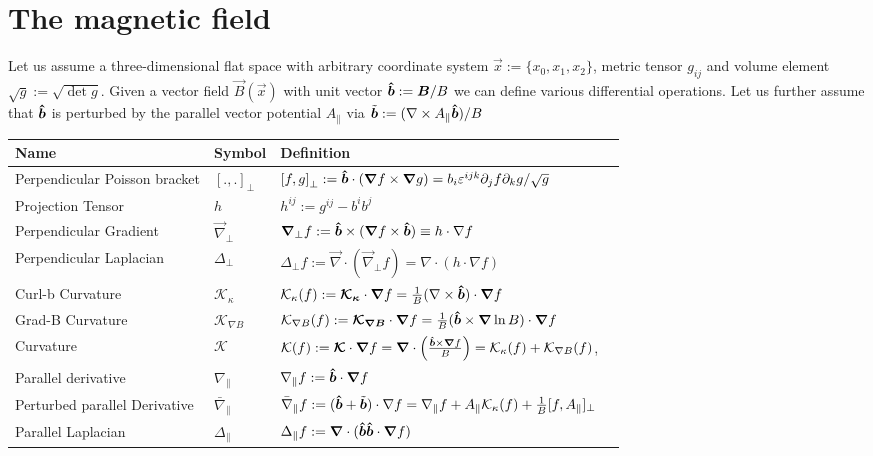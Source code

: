 \section{The magnetic field}\label{sec:magnetic}
Let us assume a three-dimensional flat space with arbitrary coordinate
system $\vec x :=\{x_0, x_1, x_2\}$, metric
tensor $g_{ij}$ and volume element $\sqrt{g} := \sqrt{\det g}$.
Given a vector field $\vec B(\vec x)$ with unit vector $\bm{\hat{b}} := {\boldsymbol{B}}/B$
we can define various differential operations.
Let us further assume that $\bm{\hat{b}}$ is perturbed by the parallel
vector potential $A_\parallel$ via
$\tilde{ {\boldsymbol{b}} } := ({\nabla \times A_\parallel \bm{\hat{b}})}/{B}$
\begin{longtable}{lll>{\RaggedRight}p{7cm}}
\rowcolor{gray!50}\textbf{Name} &  \textbf{Symbol} & \textbf{Definition} \\
\midrule
    Perpendicular Poisson bracket&
    $\left[.,.\right]_\perp$ &
    $\left[f,g\right]_\perp := \bm{\hat{b}} \cdot \left({\boldsymbol{\nabla}} f \times {\boldsymbol{\nabla}} g\right) =
    b_i \varepsilon^{ijk}\partial_j f\partial_k g/\sqrt{g}$  \\
    Projection Tensor&
    $h $ & $h^{ij} := g^{ij} - b^ib^j $\\
    Perpendicular Gradient&
    $\vec \nabla_\perp $&
    $ {\boldsymbol{\nabla}}_\perp f := \bm{\hat{b}}\times({\boldsymbol{\nabla}} f\times \bm{\hat{b}} ) \equiv
    h \cdot \nabla f$ \\
    Perpendicular Laplacian&
    $\Delta_\perp $&
    $ \Delta_\perp f:= \vec \nabla\cdot (\vec \nabla_\perp f)
    = \nabla\cdot( h\cdot\nabla f)$  \\
    Curl-b Curvature &
    $\mathcal K_\kappa$ &
    $\mathcal K_\kappa(f) := {\boldsymbol{ \mathcal K_\kappa }}\cdot {\boldsymbol{\nabla}} f = \frac{1}{B}(\nabla \times \bm{\hat{b}})\cdot {\boldsymbol{\nabla}} f$ \\
    Grad-B Curvature &
    $\mathcal K_{\nabla B} $ &
    $\mathcal K_{\nabla B}(f) := {\boldsymbol{\mathcal K_{\nabla B}}} \cdot {\boldsymbol{\nabla}} f = \frac{1}{B}(\bm{\hat{b}} \times {\boldsymbol{\nabla}} \ln B)\cdot {\boldsymbol{\nabla}} f$ \\
    Curvature &
    $\mathcal K$ &
    $\mathcal{K}(f):={\boldsymbol{\mathcal K}} \cdot {\boldsymbol{\nabla}} f = {\boldsymbol{\nabla}} \cdot \left(\frac{ \bm{\hat{b}} \times {\boldsymbol{\nabla}} f}{B} \right) = \mathcal K_\kappa(f) + \mathcal K_{\nabla B}(f)$,\\
    Parallel derivative&
    $\nabla_\parallel $&
    $ \nabla_\parallel f := \bm{\hat{b}}\cdot{\boldsymbol{\nabla}} f$ \\
    Perturbed parallel Derivative&
    $\bar\nabla_\parallel$ &
    $\bar\nabla_\parallel f := (\bm{\hat{b}} + \tilde{{\boldsymbol{b}} })\cdot \nabla f = \nabla_\parallel f + A_\parallel \mathcal K_\kappa(f) + \frac{1}{B}[ f, A_\parallel]_\perp$ \\
    Parallel Laplacian&
    $\Delta_\parallel $&
    $\Delta_\parallel f:= {\boldsymbol{\nabla}} \cdot ( \bm{\hat{b}}\bm{\hat{b}}\cdot{\boldsymbol{\nabla}} f )$\\
\bottomrule
\end{longtable}
